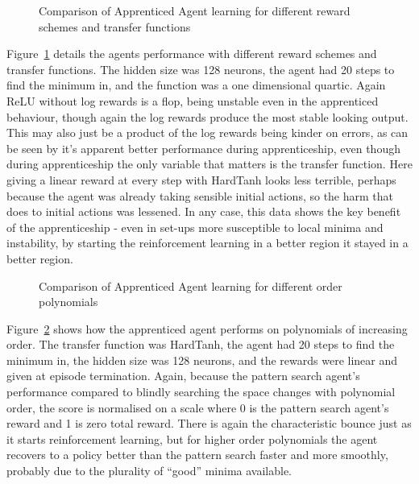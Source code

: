 \begin{figure}
\centering

\caption{Comparison of Apprenticed Agent learning for different reward schemes and transfer functions}
\label{fig:exp3app}
\end{figure}

Figure~\ref{fig:exp3app} details the agents performance with different reward schemes and transfer functions. The hidden size was 128 neurons, the agent had 20 steps to find the minimum in, and the function was a one dimensional quartic. Again ReLU without log rewards is a flop, being unstable even in the apprenticed behaviour, though again the log rewards produce the most stable looking output. This may also just be a product of the log rewards being kinder on errors, as can be seen by it's apparent better performance during apprenticeship, even though during apprenticeship the only variable that matters is the transfer function. Here giving a linear reward at every step with HardTanh looks less terrible, perhaps because the agent was already taking sensible initial actions, so the harm that does to initial actions was lessened. In any case, this data shows the key benefit of the apprenticeship - even in set-ups more susceptible to local minima and instability, by starting the reinforcement learning in a better region it stayed in a better region.

\begin{figure}
\centering

\caption{Comparison of Apprenticed Agent learning for different order polynomials}
\label{fig:exp2parapp}
\end{figure}

Figure~\ref{fig:exp2parapp} shows how the apprenticed agent performs on polynomials of increasing order. The transfer function was HardTanh, the agent had 20 steps to find the minimum in, the hidden size was 128 neurons, and the rewards were linear and given at episode termination. Again, because the pattern search agent's performance compared to blindly searching the space changes with polynomial order, the score is normalised on a scale where 0 is the pattern search agent's reward and 1 is zero total reward. There is again the characteristic bounce just as it starts reinforcement learning, but for higher order polynomials the agent recovers to a policy better than the pattern search faster and more smoothly, probably due to the plurality of ``good'' minima available.

